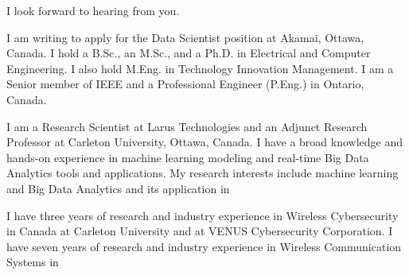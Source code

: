 \documentclass[11pt,a4paper,roman]{moderncv}        %
\begin{document}
\date{\today}
\closing{I look forward to hearing from you.}
\makelettertitle

\hspace{0.5cm} I am writing to apply for the Data Scientist position at Akamai, Ottawa, Canada. I hold a B.Sc., an M.Sc., and a Ph.D. in Electrical and Computer Engineering. I also hold M.Eng. in Technology Innovation Management. I am a Senior member of IEEE and a Professional Engineer (P.Eng.) in Ontario, Canada.  

\vspace{10pt}

\hspace{0.5cm} I am a Research Scientist at Larus Technologies and an Adjunct Research Professor at Carleton University, Ottawa, Canada.  I have a broad knowledge and hands-on experience in machine learning modeling and real-time Big Data Analytics tools and applications. My research interests include machine learning and Big Data Analytics and its application in 

\vspace{5pt}


\hspace{0.5cm}  I have three years of research and industry experience in Wireless Cybersecurity in Canada at Carleton University and at VENUS Cybersecurity Corporation. I have seven years of research and industry experience in Wireless Communication Systems in 

\vspace{5pt}




\makeletterclosing
\end{document}
